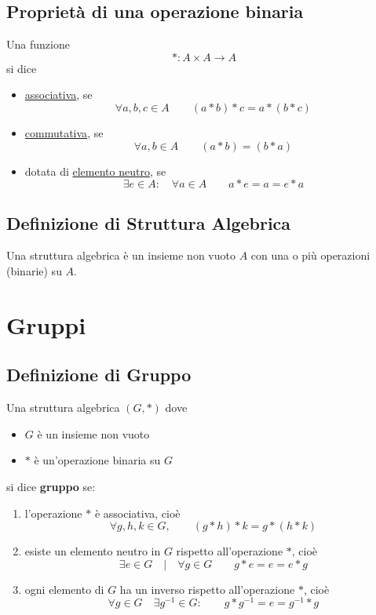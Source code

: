 \documentclass[a4paper,12pt, oneside]{book}
\begin{document}
\subsection{Proprietà di una operazione \textbf{binaria}}
Una funzione
$$* : A \times A \longrightarrow A$$
si dice \begin{itemize}
	\item \underline{associativa}, se $$\forall a,b,c \in A \qquad (a*b)*c = a*(b*c)$$
	\item \underline{commutativa}, se $$\forall a,b \in A \qquad (a*b) = (b*a)$$
	\item dotata di \underline{elemento neutro}, se $$\exists e \in A: \quad \forall a \in A \qquad a*e=a=e*a$$
\end{itemize}
\subsection{Definizione di Struttura Algebrica}
\begin{definizione}
	Una struttura algebrica è un insieme non vuoto $A$ con una o più operazioni (binarie) su $A$.
\end{definizione}

\section{Gruppi}
\subsection{Definizione di Gruppo}
\begin{definizione}
	Una struttura algebrica $(G, *)$
	dove \begin{itemize}
		\item $G$ è un insieme non vuoto
		\item $*$ è un'operazione binaria su $G$
	\end{itemize}
	si dice \textbf{gruppo} se:
	\begin{enumerate}
		\item l'operazione $*$ è associativa, cioè $$\forall g,h,k \in G, \qquad (g*h)*k=g*(h*k)$$
		\item esiste un elemento neutro in $G$ rispetto all'operazione $*$, cioè $$\exists e \in G \quad | \quad \forall g \in G \qquad g*e=e=e*g$$
		\item ogni elemento di $G$ ha un inverso rispetto all'operazione $*$, cioè $$\forall g \in G \quad \exists g^{-1} \in G: \qquad g*g^{-1}=e=g^{-1}*g$$
	\end{enumerate}
\end{definizione}
\end{document}
